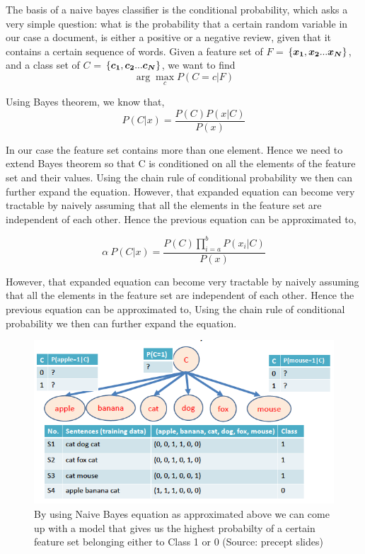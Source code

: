 \documentclass{article} %
\begin{document}
The basis of a naive bayes classifier is the conditional probability, which asks a very simple question: what is the probability that a certain random variable in our case a document, is either a positive or a negative review, given that it contains a certain sequence of words. Given a feature set of $F$ = $\mathcal \{\bm{x_1},\bm{x_2}...\bm{x_N}\}$, and a class set of $C$ = $\mathcal \{\bm{c_1},\bm{c_2}...\bm{c_N}\}$, we want to find 
\begin{equation*}
\arg\max_{c} P(C=c|F)
\end{equation*}

Using Bayes theorem, we know that, 
\begin{equation*}
P(C|x) = \frac {P(C)P(x|C)}{P(x)}
\end{equation*}

In our case the feature set contains more than one element. Hence we need to extend Bayes theorem so that C is conditioned on  all the elements of the feature set and their values. Using the chain rule of conditional probability we then can further expand the equation. However, that expanded equation can become very tractable by naively assuming that all the elements in the feature set are independent of each other. Hence the previous equation can be approximated to, 

\begin{equation*}
\alpha  \     P(C|x) = \frac {{P(C)}\prod_{i=a}^{b}P(x_i|C)}{P(x)}
\end{equation*}

However, that expanded equation can become very tractable by naively assuming that all the elements in the feature set are independent of each other. Hence the previous equation can be approximated to, Using the chain rule of conditional probability we then can further expand the equation. 

\begin{figure}[H]
  \centering
  \includegraphics[scale=0.4]{bernoulliNBexample3}
  \caption{By using Naive Bayes equation as approximated above we can come up with a model that gives us the highest probabilty of a certain feature set belonging either to Class 1 or 0 (Source: precept slides)}   
  \label{}
\end{figure}
\end{document}
